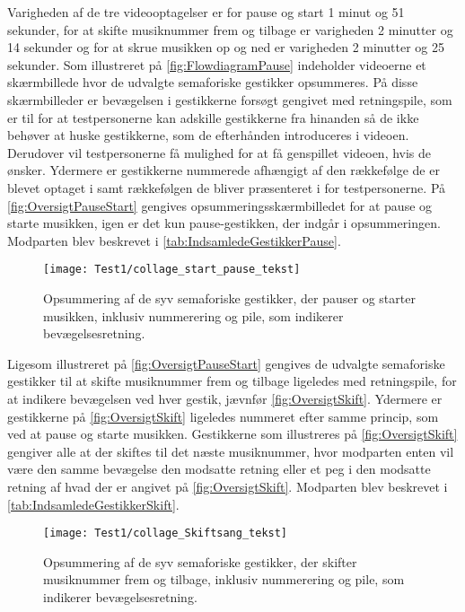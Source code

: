 Varigheden af de tre videooptagelser er for pause og start 1 minut og 51 sekunder, for at skifte musiknummer frem og tilbage er varigheden 2 minutter og 14 sekunder og for at skrue musikken op og ned er varigheden 2 minutter og 25 sekunder.\blankline
%
Som illustreret på \autoref{fig:FlowdiagramPause} indeholder videoerne et skærmbillede hvor de udvalgte semaforiske gestikker opsummeres. På disse skærmbilleder er bevægelsen i gestikkerne forsøgt gengivet med retningspile, som er til for at testpersonerne kan adskille gestikkerne fra hinanden så de ikke behøver at huske gestikkerne, som de efterhånden introduceres i videoen. Derudover vil testpersonerne få mulighed for at få genspillet videoen, hvis de ønsker. Ydermere er gestikkerne nummerede afhængigt af den rækkefølge de er blevet optaget i samt rækkefølgen de bliver præsenteret i for testpersonerne. På \autoref{fig:OversigtPauseStart} gengives opsummeringsskærmbilledet for at pause og starte musikken, igen er det kun pause-gestikken, der indgår i opsummeringen. Modparten blev beskrevet i \autoref{tab:IndsamledeGestikkerPause}.  
%
\begin{figure}[H]
	\centering
	\texttt{[image: Test1/collage\_start\_pause\_tekst]}
	\caption{Opsummering af de syv semaforiske gestikker, der pauser og starter musikken, inklusiv nummerering og pile, som indikerer bevægelsesretning.}
	\label{fig:OversigtPauseStart}
\end{figure}
\noindent
%
Ligesom illustreret på \autoref{fig:OversigtPauseStart} gengives de udvalgte semaforiske gestikker til at skifte musiknummer frem og tilbage ligeledes med retningspile, for at indikere bevægelsen ved hver gestik, jævnfør \autoref{fig:OversigtSkift}. Ydermere er gestikkerne på \autoref{fig:OversigtSkift} ligeledes nummeret efter samme princip, som ved at pause og starte musikken. Gestikkerne som illustreres på \autoref{fig:OversigtSkift} gengiver alle at der skiftes til det næste musiknummer, hvor modparten enten vil være den samme bevægelse den modsatte retning eller et peg i den modsatte retning af hvad der er angivet på \autoref{fig:OversigtSkift}. Modparten blev beskrevet i \autoref{tab:IndsamledeGestikkerSkift}.
%
\begin{figure}[H]
	\centering
	\texttt{[image: Test1/collage\_Skiftsang\_tekst]}
	\caption{Opsummering af de syv semaforiske gestikker, der skifter musiknummer frem og tilbage, inklusiv nummerering og pile, som indikerer bevægelsesretning.}
	\label{fig:OversigtSkift}
\end{figure}
